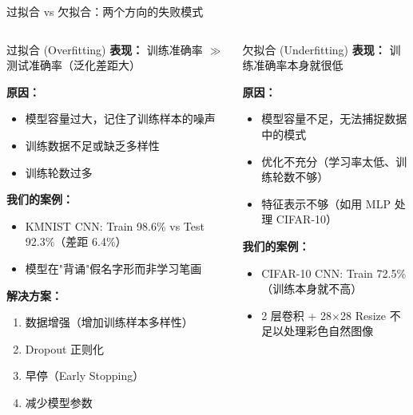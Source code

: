 \documentclass[aspectratio=169]{ctexbeamer}
\begin{document}
\begin{frame}[shrink=20]{过拟合 vs 欠拟合：两个方向的失败模式}
\small

\begin{columns}[T]
\begin{block}{过拟合 (Overfitting)}
\footnotesize
\textbf{表现：} 训练准确率 $\gg$ 测试准确率（泛化差距大）

\textbf{原因：}
\begin{itemize}
  \item 模型容量过大，记住了训练样本的噪声
  \item 训练数据不足或缺乏多样性
  \item 训练轮数过多
\end{itemize}

\textbf{我们的案例：}
\begin{itemize}
  \item KMNIST CNN: Train 98.6\% vs Test 92.3\%（差距 6.4\%）
  \item 模型在"背诵"假名字形而非学习笔画
\end{itemize}

\textbf{解决方案：}
\begin{enumerate}
  \item 数据增强（增加训练样本多样性）
  \item Dropout 正则化
  \item 早停（Early Stopping）
  \item 减少模型参数
\end{enumerate}
\end{block}

\begin{block}{欠拟合 (Underfitting)}
\footnotesize
\textbf{表现：} 训练准确率本身就很低

\textbf{原因：}
\begin{itemize}
  \item 模型容量不足，无法捕捉数据中的模式
  \item 优化不充分（学习率太低、训练轮数不够）
  \item 特征表示不够（如用 MLP 处理 CIFAR-10）
\end{itemize}

\textbf{我们的案例：}
\begin{itemize}
  \item CIFAR-10 CNN: Train 72.5\%（训练本身就不高）
  \item 2 层卷积 + 28$\times$28 Resize 不足以处理彩色自然图像
\end{itemize}


\end{block}
\end{columns}
\end{frame}
\end{document}
